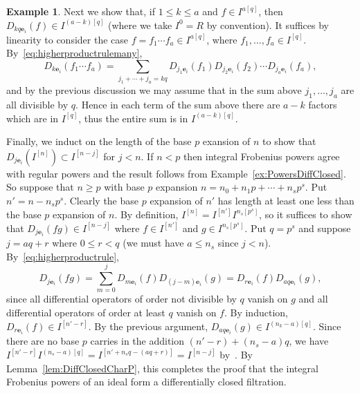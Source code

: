 \documentclass[12pt, reqno]{amsart}
\numberwithin{equation}{section}
\newcommand{\be}{\mathbf{e}}
\theoremstyle{plain} %
\theoremstyle{definition}
\newtheorem{ex}[thm]{Example}
\theoremstyle{remark}
\begin{document}
\begin{ex}
Next we show that, if $1\le k\le a$ and $f\in I^{a[q]}$, then $D_{kq\be_i}(f)\in I^{(a-k)[q]}$ (where we take $I^0=R$ by convention).  It suffices by linearity to consider the case $f=f_1\cdots f_a\in I^{a[q]}$, where $f_1,\ldots,f_a\in I^{[q]}$.  By~\eqref{eq:higherproductrulemany},
\[
D_{k\be_i}(f_1\cdots f_a)=\sum_{j_1+\cdots+j_a=kq} D_{j_1\be_i}(f_1)D_{j_2\be_i}(f_2)\cdots D_{j_a\be_i}(f_a),
\]
and by the previous discussion we may assume that in the sum above $j_1,\ldots,j_a$ are all divisible by $q$.  Hence in each term of the sum above there are $a-k$ factors which are in $I^{[q]}$, thus the entire sum is in $I^{(a-k)[q]}$.

Finally, we induct on the length of the base $p$ exansion of $n$ to show that $D_{j\be_i}(I^{[n]})\subset I^{[n-j]}$ for $j<n$.  If $n<p$ then integral Frobenius powers agree with regular powers and the result follows from Example~\ref{ex:PowersDiffClosed}.  So suppose that $n\ge p$ with base $p$ expansion $n=n_0+n_1p+\cdots+n_sp^s$.  Put $n'=n-n_sp^s$.  Clearly the base $p$ expansion of $n'$ has length at least one less than the base $p$ expansion of $n$.  By definition, $I^{[n]}=I^{[n']}I^{n_s[p^s]}$, so it suffices to show that $D_{j\be_i}(fg)\in I^{[n-j]}$ where $f\in I^{[n']}$ and $g\in I^{n_s[p^s]}$.  Put $q=p^s$ and suppose $j=aq+r$ where $0\le r<q$ (we must have $a\le n_s$ since $j<n$). By~\eqref{eq:higherproductrule},
\[
D_{j\be_i}(fg)=\sum_{m=0}^j D_{m\be_i}(f)D_{(j-m)\be_i}(g)=D_{r\be_i}(f)D_{aq\be_i}(g),
\]
since all differential operators of order not divisible by $q$ vanish on $g$ and all differential operators of order at least $q$ vanish on $f$. By induction, $D_{r\be_i}(f)\in I^{[n'-r]}$.  By the previous argument, $D_{aq\be_i}(g)\in I^{(n_k-a)[q]}$.  Since there are no base $p$ carries in the addition $(n'-r)+(n_s-a)q$, we have $I^{[n'-r]}I^{(n_s-a)[q]}=I^{[n'+n_sq-(aq+r)]}=I^{[n-j]}$ by~\cite[Proposition~3.4]{Hernandez-Teixera-Witt-2020}.  By Lemma~\ref{lem:DiffClosedCharP}, this completes the proof that the integral Frobenius powers of an ideal form a differentially closed filtration.
\end{ex}
\end{document}
